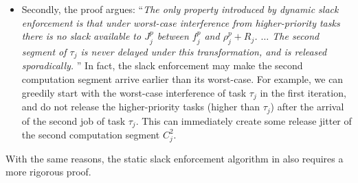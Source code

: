 \begin{itemize}
\begin{itemize}
  \item Secondly, the proof argues: ``\emph{The only property
      introduced by dynamic slack enforcement is that under worst-case
      interference from higher-priority tasks there is no slack
      available to $J_j^p$ between $f_j^p$ and $\rho_j^p + R_j$.
      $\ldots$ The second segment of $\tau_j$ is never delayed under
      this transformation, and is released sporadically.} '' In fact,
    the slack enforcement may make the second computation segment
    arrive earlier than its worst-case. For example, we can greedily
    start with the worst-case interference of task $\tau_j$ in the
    first iteration, and do not release the higher-priority tasks
    (higher than $\tau_j$) after the arrival of the second job of task
    $\tau_j$. This can immediately create some release jitter of the
    second computation segment $C_j^2$.
  \end{itemize}
  With the same reasons, the static slack enforcement algorithm in
  \cite{LR:rtas10} also requires a more rigorous proof.
\end{itemize}

\label{sec:correct-solutions} 

